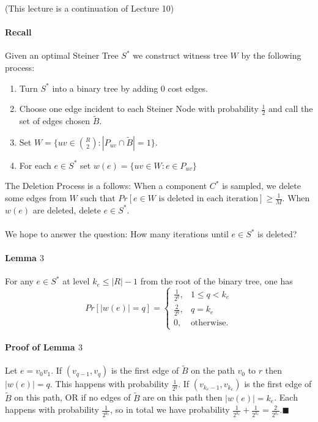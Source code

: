\documentclass[letterpaper,12pt,oneside,onecolumn]{article}
\begin{document}
(This lecture is a continuation of Lecture 10)
\paragraph{Recall}
Given an optimal Steiner Tree $S^*$ we construct witness tree $W$ by the following process:
\begin{enumerate}
\item Turn $S^*$ into a binary tree by adding $0$ cost edges.
\item Choose one edge incident to each Steiner Node with probability $\frac{1}{2}$ and call the set of edges chosen $\tilde{B}$.
\item Set $W = \{ uv \in {R \choose 2} : |P_{uv} \cap \tilde{B}| = 1\}$.
\item For each $e \in S^*$ set $w(e) = \{ uv \in W : e \in P_{uv}\}$
\end{enumerate}
The Deletion Process is a follows: When a component $C^*$ is sampled, we delete some edges from $W$ such that $Pr[e \in W \text{ is deleted in each iteration}] \geq \frac{1}{M}$. When $w(e)$ are deleted, delete $e \in S^*$.
\paragraph{}
We hope to answer the question: How many iterations until $e \in S^*$ is deleted?
\paragraph{Lemma $3$} For any $e \in S^*$ at level $k_e \leq |R| - 1$ from the root of the binary tree, one has
$$Pr[|w(e)| = q] = \begin{cases}
\frac{1}{2^q}, &1\leq q < k_e \\
\frac{2}{2^q}, &q=k_e \\
0, &\text{otherwise}.
\end{cases}$$
\paragraph{Proof of Lemma $3$}
Let $e=v_0v_1$. If $(v_{q-1}, v_q)$ is the first edge of $\tilde{B}$ on the path $v_0$ to $r$ then $|w(e)| = q$. This happens with probability $\frac{1}{2^q}$. If $(v_{k_e - 1}, v_{k_e})$ is the first edge of $\tilde{B}$ on this path, OR if no edges of $\tilde{B}$ are on this path then $|w(e)| = k_e$. Each happens with probability $\frac{1}{2^{k_e}}$, so in total we have probability $\frac{1}{2^{k_e}} + \frac{1}{2^{k_e}} = \frac{2}{2^{k_e}}$.$\blacksquare$
\end{document}
